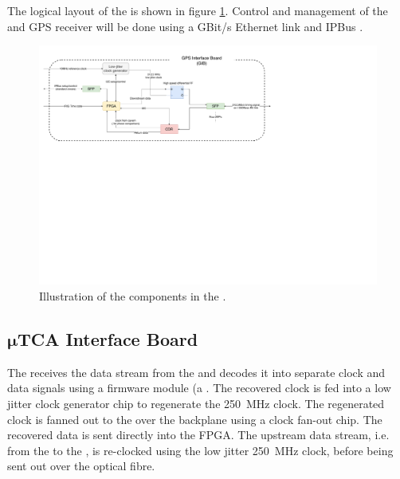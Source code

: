 \documentclass{dune}
\begin{document}
The logical layout of the  is shown in figure \ref{fig:gib_layout}. Control and management of the  and GPS receiver will be done using a GBit/s Ethernet link and IPBus \cite{ipbus}.

\begin{figure}[h]
\includegraphics[width=\textwidth]{gib_block_diagram.pdf}
\caption{Illustration of the components in the .}
\label{fig:gib_layout}
\end{figure}

\subsection[$\mu$TCA Interface Board]{$\boldsymbol{\mu}$TCA Interface Board}
The  receives the  data stream from the  and decodes it into separate clock and data signals using a firmware  module (a  . The recovered clock is fed into a low jitter clock generator chip to regenerate the \SI{250}{\MHz} clock. The regenerated clock is fanned out to the  over the  backplane using a clock fan-out chip. The recovered data is sent directly into the  FPGA. The upstream data stream, i.e. from the  to the , is re-clocked using the low jitter \SI{250}{\MHz} clock, before being sent out over the optical fibre.
\end{document}
